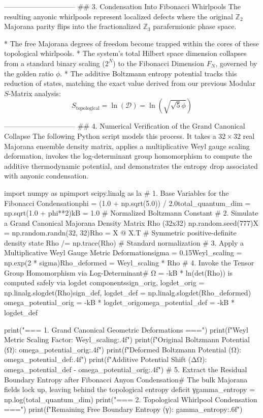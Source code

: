 ------------------------------
## 3. Condensation Into Fibonacci Whirlpools
The resulting anyonic whirlpools represent localized defects where the original $\mathbb{Z}_2$ Majorana parity flips into the fractionalized $\mathbb{Z}_3$ parafermionic phase space.

* The free Majorana degrees of freedom become trapped within the cores of these topological whirlpools.
* The system's total Hilbert space dimension collapses from a standard binary scaling ($2^N$) to the Fibonacci Dimension $F_N$, governed by the golden ratio $\phi$.
* The additive Boltzmann entropy potential tracks this reduction of states, matching the exact value derived from our previous Modular $S$-Matrix analysis:
$$S_{\text{topological}} = \ln(\mathcal{D}) = \ln\left(\sqrt{\sqrt{5}\phi}\right)$$ 

------------------------------
## 4. Numerical Verification of the Grand Canonical Collapse
The following Python script models this process. It takes a $32 \times 32$ real Majorana ensemble density matrix, applies a multiplicative Weyl gauge scaling deformation, invokes the log-determinant group homomorphism to compute the additive thermodynamic potential, and demonstrates the entropy drop associated with anyonic condensation.

import numpy as npimport scipy.linalg as la
# 1. Base Variables for the Fibonacci Condensationphi = (1.0 + np.sqrt(5.0)) / 2.0total_quantum_dim = np.sqrt(1.0 + phi**2)kB = 1.0  # Normalized Boltzmann Constant
# 2. Simulate a Grand Canonical Majorana Density Matrix Rho (32x32)
np.random.seed(777)X = np.random.randn(32, 32)Rho = X @ X.T  # Symmetric positive-definite density state
Rho /= np.trace(Rho)  # Standard normalization
# 3. Apply a Multiplicative Weyl Gauge Metric Deformationsigma = 0.15Weyl_scaling = np.exp(2 * sigma)Rho_deformed = Weyl_scaling * Rho
# 4. Invoke the Tensor Group Homomorphism via Log-Determinant# Ω = -kB * ln(det(Rho)) is computed safely via logdet componentssign_orig, logdet_orig = np.linalg.slogdet(Rho)sign_def, logdet_def = np.linalg.slogdet(Rho_deformed)
omega_potential_orig = -kB * logdet_origomega_potential_def = -kB * logdet_def

print("=== 1. Grand Canonical Geometric Deformations ===")
print(f"Weyl Metric Scaling Factor:        {Weyl_scaling:.4f}")
print(f"Original Boltzmann Potential (Ω): {omega_potential_orig:.4f}")
print(f"Deformed Boltzmann Potential (Ω): {omega_potential_def:.4f}")
print(f"Additive Potential Shift (ΔΩ):    {omega_potential_def - omega_potential_orig:.4f}")
# 5. Extract the Residual Boundary Entropy after Fibonacci Anyon Condensation# The bulk Majorana fields lock up, leaving behind the topological entropy deficit γgamma_entropy = np.log(total_quantum_dim)
print("\n=== 2. Topological Whirlpool Condensation ===")
print(f"Remaining Free Boundary Entropy (γ): {gamma_entropy:.6f}")

